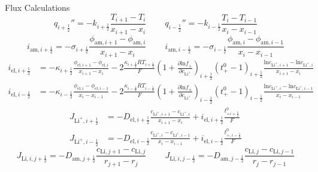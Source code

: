 \documentclass[12pt]{article}
\begin{document}
\fontsize{12}{12}\selectfont
Flux Calculations
\begin{equation}
	q_{i+\frac{1}{2}}'' = -k_{i+\frac{1}{2}} \frac{T_{i+1} - T_i    }{x_{i+1} - x_{i}  }   \;\;\;\;\;\;\;\; 
	q_{i-\frac{1}{2}}'' = -k_{i-\frac{1}{2}} \frac{T_{i}   - T_{i-1}}{x_{i}   - x_{i-1}}
\end{equation}
%
\begin{equation}
	i_{\text{am},i+\frac{1}{2}} = -\sigma_{i+\frac{1}{2}} \frac{ \phi_{\text{am},i+1} - \phi_{\text{am},i} }{x_{i+1} - x_{i}} \;\;\;\;\;\;\;\;
	i_{\text{am},i-\frac{1}{2}} = -\sigma_{i-\frac{1}{2}} \frac{ \phi_{\text{am},i} - \phi_{\text{am},i-1} }{x_{i} - x_{i-1}}
\end{equation}
%
\begin{equation}
	\begin{split}
		i_{\text{el},i+\frac{1}{2}} &= -\kappa_{i+\frac{1}{2}} \frac{ \phi_{\text{el},i+1} - \phi_{\text{el},i} }{x_{i+1} - x_{i}} - 2\frac{\kappa_{i+\frac{1}{2}} RT_{i+\frac{1}{2}}}{F}\left(1+\frac{\partial \text{ln} f_\pm}{\partial c_{\text{Li}^+}} \right)_{i+\frac{1}{2}} \left( t_+^0 - 1 \right)_{i+\frac{1}{2}} \frac{  \text{ln} c_{\text{Li}^+,i+1}  -  \text{ln} c_{\text{Li}^+,i}  }{x_{i+1} - x_{i}} \\
		i_{\text{el},i-\frac{1}{2}} &= -\kappa_{i-\frac{1}{2}} \frac{ \phi_{\text{el},i} - \phi_{\text{el},i-1} }{x_{i} - x_{i-1}} - 2\frac{\kappa_{i-\frac{1}{2}} RT_{i-\frac{1}{2}}}{F}\left(1+\frac{\partial \text{ln} f_\pm}{\partial c_{\text{Li}^+}} \right)_{i-\frac{1}{2}} \left( t_+^0 - 1 \right)_{i-\frac{1}{2}} \frac{  \text{ln} c_{\text{Li}^+,i}  -  \text{ln} c_{\text{Li}^+,i-1}  }{x_{i} - x_{i-1}}
	\end{split}
\end{equation}
%
\begin{equation}
	\begin{split}
		J_{\text{Li}^+,i+\frac{1}{2}} &= - D_{\text{el},i+\frac{1}{2}}  \frac{  c_{\text{Li}^+,i+1}  -  c_{\text{Li}^+,i} }{x_{i+1} - x_{i}} + i_{\text{el},i+\frac{1}{2}} \frac{t_{+i+\frac{1}{2}}^0}{F}\\
		J_{\text{Li}^+,i-\frac{1}{2}} &= - D_{\text{el},i-\frac{1}{2}}  \frac{  c_{\text{Li}^+,i}  -  c_{\text{Li}^+,i-1} }{x_{i} - x_{i-1}} + i_{\text{el},i-\frac{1}{2}} \frac{t_{+,i-\frac{1}{2}}^0}{F}
	\end{split}
\end{equation}
%
\begin{equation}
	J_{\text{Li},i,j+\frac{1}{2}} = - D_{\text{am},j+\frac{1}{2}}  \frac{  c_{\text{Li},j+1}  -  c_{\text{Li},j} }{ r_{j+1} - r_{j} }  \;\;\;\;\;\;\;\;
	J_{\text{Li},i,j-\frac{1}{2}} = - D_{\text{am},j-\frac{1}{2}}  \frac{  c_{\text{Li},j}  -  c_{\text{Li},j-1} }{ r_{j} - r_{j-1} }
\end{equation}
%
\end{document}
